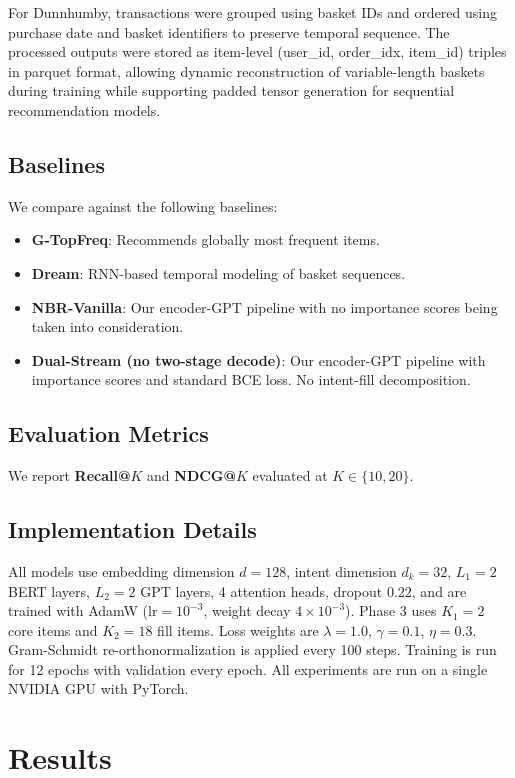 \documentclass[conference]{IEEEtran}
\begin{document}
For Dunnhumby, transactions were grouped using basket IDs and ordered using purchase date and basket identifiers to preserve temporal sequence. The processed outputs were stored as item-level (user\_id, order\_idx, item\_id) triples in parquet format, allowing dynamic reconstruction of variable-length baskets during training while supporting padded tensor generation for sequential recommendation models.


\subsection{Baselines}
We compare against the following baselines:
\begin{itemize}
\item \textbf{G-TopFreq}: Recommends globally most frequent items.
\item \textbf{Dream}: RNN-based temporal modeling of
basket sequences.
\item \textbf{NBR-Vanilla}: Our encoder-GPT pipeline with no importance scores being taken into consideration.
\item \textbf{Dual-Stream (no two-stage decode)}: Our encoder-GPT pipeline with importance scores and standard BCE loss. No intent-fill decomposition.
\end{itemize}

\subsection{Evaluation Metrics}
We report \textbf{Recall@$K$} and \textbf{NDCG@$K$} evaluated at $K \in \{10, 20\}$.

\subsection{Implementation Details}
All models use embedding dimension $d = 128$, intent dimension $d_k = 32$, $L_1 = 2$ BERT layers, $L_2 = 2$ GPT layers, 4 attention heads, dropout $0.22$, and are trained with AdamW ($\text{lr}=10^{-3}$, weight decay $4 \times 10^{-3}$). Phase 3 uses $K_1 = 2$ core items and $K_2 = 18$ fill items. Loss weights are $\lambda = 1.0$, $\gamma = 0.1$, $\eta = 0.3$. Gram-Schmidt re-orthonormalization is applied every 100 steps. Training is run for 12 epochs with validation every epoch. All experiments are run on a single NVIDIA GPU with PyTorch.


\section{Results}
\label{sec:results}
\end{document}
